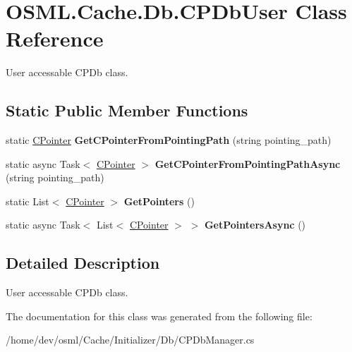 \hypertarget{classOSML_1_1Cache_1_1Db_1_1CPDbUser}{}\section{O\+S\+M\+L.\+Cache.\+Db.\+C\+P\+Db\+User Class Reference}
\label{classOSML_1_1Cache_1_1Db_1_1CPDbUser}


User accessable C\+P\+Db class.  


\subsection*{Static Public Member Functions}
\begin{DoxyCompactItemize}
\item 
\mbox{\label{classOSML_1_1Cache_1_1Db_1_1CPDbUser_a14321f4718e763e7dedc8c750ff10db0}} 
static \mbox{\hyperlink{classOSML_1_1Cache_1_1CPointer}{C\+Pointer}} {\bfseries Get\+C\+Pointer\+From\+Pointing\+Path} (string pointing\+\_\+path)
\item 
\mbox{\label{classOSML_1_1Cache_1_1Db_1_1CPDbUser_a26ba8eb623abbd3c44c9c7dc96f88772}} 
static async Task$<$ \mbox{\hyperlink{classOSML_1_1Cache_1_1CPointer}{C\+Pointer}} $>$ {\bfseries Get\+C\+Pointer\+From\+Pointing\+Path\+Async} (string pointing\+\_\+path)
\item 
\mbox{\label{classOSML_1_1Cache_1_1Db_1_1CPDbUser_a671264f4cd7c28b8de4af1fcafb5b4c8}} 
static List$<$ \mbox{\hyperlink{classOSML_1_1Cache_1_1CPointer}{C\+Pointer}} $>$ {\bfseries Get\+Pointers} ()
\item 
\mbox{\label{classOSML_1_1Cache_1_1Db_1_1CPDbUser_a7f2257ece11d5be04acfe3bcdf33e337}} 
static async Task$<$ List$<$ \mbox{\hyperlink{classOSML_1_1Cache_1_1CPointer}{C\+Pointer}} $>$ $>$ {\bfseries Get\+Pointers\+Async} ()
\end{DoxyCompactItemize}


\subsection{Detailed Description}
User accessable C\+P\+Db class. 



The documentation for this class was generated from the following file\+:\begin{DoxyCompactItemize}
\item 
/home/dev/osml/\+Cache/\+Initializer/\+Db/C\+P\+Db\+Manager.\+cs\end{DoxyCompactItemize}

